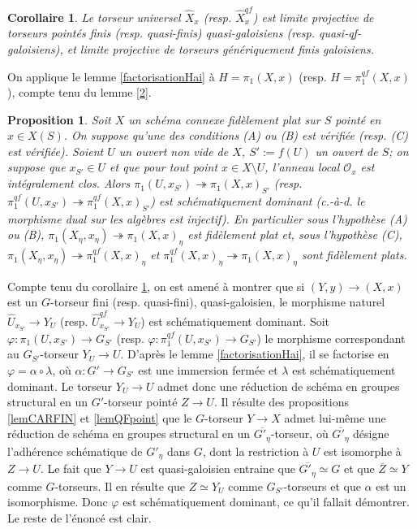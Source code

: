 \documentclass[11pt]{amsart}
\numberwithin{equation}{section}
\newtheorem{prop}[thm]{Proposition}
\newtheorem{cor}[thm]{Corollaire}
\theoremstyle{definition}
\theoremstyle{remark}
\newcommand{\dO}{{\mathcal O}}
\begin{document}
 \begin{cor}\label{proj} Le torseur universel $\widehat X_x$ (resp. $\widehat X _x ^{qf}$) est limite projective de torseurs point\'es finis (resp. quasi-finis) quasi-galoisiens (resp. quasi-qf-galoisiens), et limite projective de torseurs g\'en\'eriquement finis galoisiens.
 \end{cor}

\proof On applique le lemme \ref{factorisationHai} \`a $H = \pi _1 (X,x)$ (resp. $H =\pi _1^{qf} (X,x)$), compte tenu du lemme \ref{2}. \endproof



\begin{prop}\label{propSURFIN} Soit $X$ un sch\'ema connexe fid\`element plat sur $S$ point\'e en $x\in X(S)$.  On suppose qu'une des conditions (A) ou (B) est v\'erifi\'ee (resp. (C) est v\'erifi\'ee). Soient $U$ un ouvert non vide de $X$, $S':=f(U)$ un ouvert de $S$; on suppose que $x_{S'}\in U$ et que pour tout point $x\in X\setminus U$, l'anneau local $\dO _x$ est int\'egralement clos. Alors $\pi_1(U,x_{S'})  \twoheadrightarrow  \pi_1(X,x)_{S'}  $ (resp. $\pi_1^{qf}(U,x_{S'})  \twoheadrightarrow  \pi_1^{qf}(X,x)_{S'}  $) est  sch\'ematiquement dominant (c.-\`a-d. le morphisme dual sur les alg\`ebres est injectif). En particulier sous l'hypoth\`ese (A) ou (B),  $\pi_1(X_{\eta},x_{\eta}) \twoheadrightarrow  \pi_1(X,x)_\eta   $ est fid\`element plat et, sous l'hypoth\`ese (C), $\pi_1(X_{\eta},x_{\eta}) \twoheadrightarrow  \pi_1^{qf}(X,x)_\eta   $ et $\pi_1^{qf}(X,x)_\eta  \twoheadrightarrow  \pi_1(X,x)_\eta  $ sont fid\`element plats.
\end{prop}
\proof Compte tenu du corollaire \ref{proj}, on est amen\'e \`a montrer que si $(Y,y) \to (X,x)$ est un $G$-torseur fini (resp. quasi-fini), quasi-galoisien, le morphisme naturel $\widehat U _{x_{S'}} \to Y_U$ (resp. $\widehat U _{x_{S'}}^{qf} \to Y_U$) est sch\'ematiquement dominant. Soit $\varphi :\pi _1( U,x_{S'}) \to G_{S'}$ (resp. $\varphi :\pi _1^{qf}( U,x_{S'}) \to G_{S'}$) le morphisme correspondant au $G_{S'}$-torseur $Y_U \to U$. D'apr\`es le lemme \ref{factorisationHai}, il se factorise en $\varphi = \alpha \circ \lambda $, o\`u $\alpha : G' \to G_{S'}$ est une immersion ferm\'ee et $\lambda $ est sch\'ematiquement dominant. Le torseur $Y_U \to U$ admet donc une r\'eduction de sch\'ema en groupes structural en un $G'$-torseur point\'e $Z \to U$. Il r\'esulte des propositions \ref{lemCARFIN} et \ref{lemQFpoint} que le $G$-torseur $Y \to X$ admet lui-m\^eme une r\'eduction de sch\'ema en groupes structural en un $\overline {G' _\eta}$-torseur, o\`u $\overline {G' _\eta}$ d\'esigne l'adh\'erence sch\'ematique de $G'_\eta $ dans $G$, dont la restriction \`a $U$ est isomorphe \`a $Z \to U$. Le fait que $Y \to U $ est quasi-galoisien entraine que $\overline {G'_\eta   }\simeq G$ et que $\overline Z \simeq Y$ comme $G$-torseurs. Il en r\'esulte que $Z \simeq Y_U$ comme $G_{S'}$-torseurs et que $\alpha $ est un isomorphisme. Donc $\varphi $ est sch\'ematiquement dominant, ce qu'il fallait d\'emontrer. Le reste de l'\'enonc\'e est clair. \endproof
\end{document}
